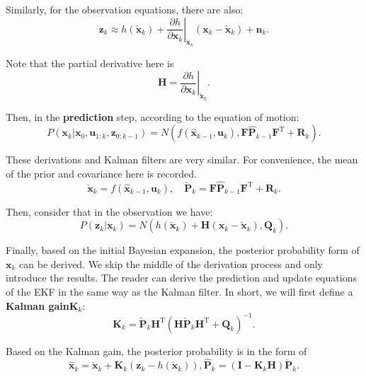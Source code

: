 Similarly, for the observation equations, there are also:
\begin{equation}
{\bm{z}_k} \approx h\left( {{{\bm{\check x}}_k}} \right) + {\left. {\frac{{\partial h}}{{\partial {\bm{x}_k}}}} \right|_{{{\bm{\check x}}_k}}}\left( {\bm{x}_k - {{\bm{\check x}}_k}} \right) + {\bm{n}_k}.
\end{equation}

Note that the partial derivative here is
\begin{equation}
\bm{H} = \left. {\frac{{\partial h}}{{\partial {\bm{x}_k}}}} \right|_{{{\bm{\check x}}_k}}.
\end{equation}

Then, in the \textbf{prediction} step, according to the equation of motion:
\begin{equation}
P\left( {{\bm{x}_k}|{\bm{x}_0},{\bm{u}_{1:k}},{\bm{z}_{0:k - 1}}} \right)
 = N(f\left( {{{\bm{\hat x}}_{k - 1}},{\bm{u}_k}} \right), \bm{F}\bm{\hat{P}}_{k-1} \bm{F}^\mathrm{T} + \bm{R}_k).
\end{equation}

These derivations and Kalman filters are very similar. For convenience, the mean of the prior and covariance here is recorded.
\begin{equation}
\bm{\check {x}}_k = f\left( {{{\bm{\hat x}}_{k - 1}},{\bm{u}_k}} \right), \quad \bm{\check{P}}_k = \bm{F}\bm{\hat{P}}_{k-1} \bm{F}^\mathrm{T} + \bm{R}_k.
\end{equation}

Then, consider that in the observation we have:
\begin{equation}
P\left( {{\bm{z}_k}|{\bm{x}_k}} \right) = N( h\left( {{{\bm{\check x}}_k}} \right) + \bm{H} \left( {\bm{x}_k - {{\bm{\check x}}_k}} \right), \bm{Q}_k ).
\end{equation}

Finally, based on the initial Bayesian expansion, the posterior probability form of $\bm{x}_k$ can be derived. We skip the middle of the derivation process and only introduce the results. The reader can derive the prediction and update equations of the EKF in the same way as the Kalman filter. In short, we will first define a \textbf{Kalman gain}$\bm{K}_k$:
\begin{equation}
\bm{K}_k = {\bm{\check{P}}_{k}}{\bm{H}^\mathrm{T}}{\left( {\bm{H}{\bm{\check P}_k}{\bm{H}^\mathrm{T}} + {\bm{Q}_k}} \right)^{ - 1}}.
\end{equation}

Based on the Kalman gain, the posterior probability is in the form of
\begin{equation}
{{\bm{\hat x}}_k} = {{\bm{\check x}}_k} + {\bm{K}_k}\left( {{\bm{z}_k} - h\left( {{\bm{\check x}_k}} \right)} \right),{\bm{\hat P}_k} = \left( {\bm{I} - {\bm{K}_k}{\bm{H}}} \right) \bm{\check{P}}_k.
\end{equation}

